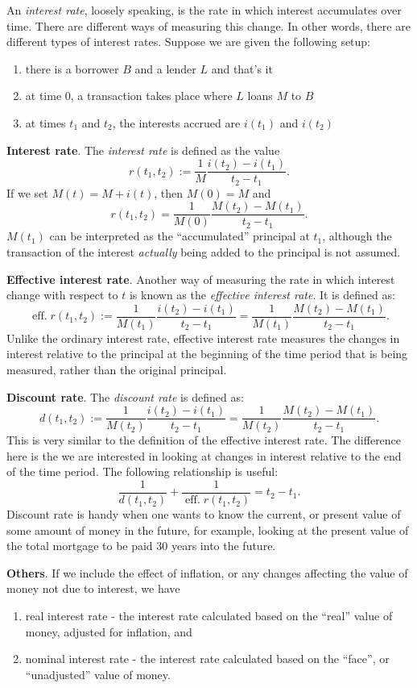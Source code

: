 \documentclass[12pt]{article}
\begin{document}
An \emph{interest rate}, loosely speaking, is the rate in which interest accumulates over time.  There are different ways of measuring this change.  In other words, there are different types of interest rates.  Suppose we are given the following setup:
\begin{enumerate}
\item there is a borrower $B$ and a lender $L$ and that's it
\item at time $0$, a transaction takes place where $L$ loans $M$ to $B$
\item at times $t_1$ and $t_2$, the interests accrued are $i(t_1)$ and $i(t_2)$
\end{enumerate}

\textbf{Interest rate}.  The \emph{interest rate} is defined as the value $$r(t_1,t_2):=\frac{1}{M}\frac{i(t_2)-i(t_1)}{t_2-t_1}.$$
If we set $M(t)=M+i(t)$, then $M(0)=M$ and 
$$r(t_1,t_2)=\frac{1}{M(0)}\frac{M(t_2)-M(t_1)}{t_2-t_1}.$$
$M(t_1)$ can be interpreted as the ``accumulated'' principal at $t_1$, although the transaction of the interest \emph{actually} being added to the principal is not assumed.

\textbf{Effective interest rate}.  Another way of measuring the rate in which interest change with respect to $t$ is known as the \emph{effective interest rate}.  It is defined as:
$$\operatorname{eff.}r(t_1,t_2):=\frac{1}{M(t_1)} \frac{i(t_2)-i(t_1)}{t_2-t_1}=\frac{1}{M(t_1)} \frac{M(t_2)-M(t_1)}{t_2-t_1}.$$
Unlike the ordinary interest rate, effective interest rate measures the changes in interest relative to the principal at the beginning of the time period that is being measured, rather than the original principal.

\textbf{Discount rate}.  The \emph{discount rate} is defined as:
$$d(t_1,t_2):=\frac{1}{M(t_2)} \frac{i(t_2)-i(t_1)}{t_2-t_1}=\frac{1}{M(t_2)} \frac{M(t_2)-M(t_1)}{t_2-t_1}.$$
This is very similar to the definition of the effective interest rate.  The difference here is the we are interested in looking at changes in interest relative to the end of the time period.  The following relationship is useful:
$$\frac{1}{d(t_1,t_2)}+\frac{1}{\operatorname{eff.}r(t_1,t_2)}=t_2-t_1.$$
Discount rate is handy when one wants to know the current, or present value of some amount of money in the future, for example, looking at the present value of the total mortgage to be paid 30 years into the future.

\textbf{Others}.  If we include the effect of inflation, or any changes affecting the value of money not due to interest, we have
\begin{enumerate}
\item real interest rate - the interest rate calculated based on the ``real'' value of money, adjusted for inflation, and
\item nominal interest rate - the interest rate calculated based on the ``face'', or ``unadjusted'' value of money.
\end{enumerate}
\end{document}

